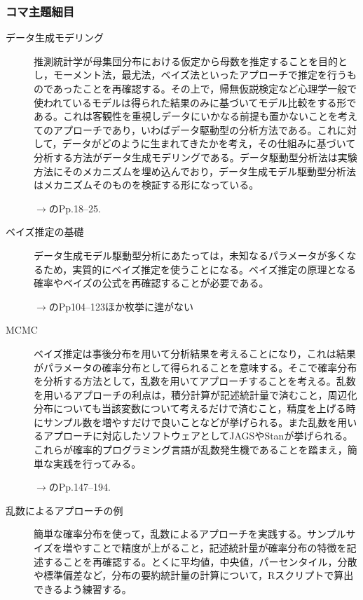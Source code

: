 \subsubsection{コマ主題細目}
\begin{description}
	\item[データ生成モデリング] 推測統計学が母集団分布における仮定から母数を推定することを目的とし，モーメント法，最尤法，ベイズ法といったアプローチで推定を行うものであったことを再確認する。その上で，帰無仮説検定など心理学一般で使われているモデルは得られた結果のみに基づいてモデル比較をする形である。これは客観性を重視しデータにいかなる前提も置かないことを考えてのアプローチであり，いわばデータ駆動型の分析方法である。これに対して，データがどのように生まれてきたかを考え，その仕組みに基づいて分析する方法がデータ生成モデリングである。データ駆動型分析法は実験方法にそのメカニズムを埋め込んでおり，データ生成モデル駆動型分析法はメカニズムそのものを検証する形になっている。

	      \begin{flushright}
		      $\to$\textcite{Matsuura201610}のPp.18--25.
	      \end{flushright}

	\item[ベイズ推定の基礎] データ生成モデル駆動型分析にあたっては，未知なるパラメータが多くなるため，実質的にベイズ推定を使うことになる。ベイズ推定の原理となる確率やベイズの公式を再確認することが必要である。

	      \begin{flushright}
		      $\to$\textcite{Maeda2017}のPp104--123ほか枚挙に遑がない
	      \end{flushright}

	\item[MCMC] ベイズ推定は事後分布を用いて分析結果を考えることになり，これは結果がパラメータの確率分布として得られることを意味する。そこで確率分布を分析する方法として，乱数を用いてアプローチすることを考える。乱数を用いるアプローチの利点は，積分計算が記述統計量で済むこと，周辺化分布についても当該変数について考えるだけで済むこと，精度を上げる時にサンプル数を増やすだけで良いことなどが挙げられる。また乱数を用いるアプローチに対応したソフトウェアとしてJAGSやStanが挙げられる。これらが確率的プログラミング言語が乱数発生機であることを踏まえ，簡単な実践を行ってみる。

	      \begin{flushright}
		      $\to$\textcite{Maeda2017}のPp.147--194.
	      \end{flushright}

	\item[乱数によるアプローチの例]簡単な確率分布を使って，乱数によるアプローチを実践する。サンプルサイズを増やすことで精度が上がること，記述統計量が確率分布の特徴を記述することを再確認する。とくに平均値，中央値，パーセンタイル，分散や標準偏差など，分布の要約統計量の計算について，Rスクリプトで算出できるよう練習する。
\end{description}


